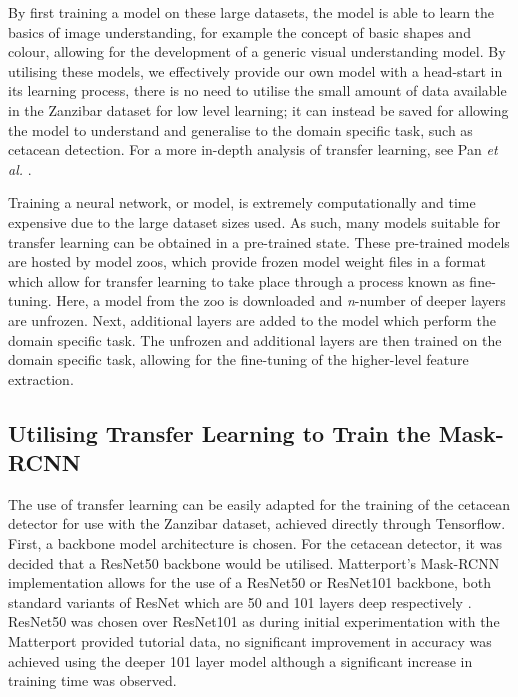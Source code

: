 By first training a model on these large datasets, the model is able to learn the basics of image understanding, for example the concept of basic shapes and colour, allowing for the development of a generic visual understanding model. By utilising these models, we effectively provide our own model with a head-start in its learning process, there is no need to utilise the small amount of data available in the Zanzibar dataset for low level learning; it can instead be saved for allowing the model to understand and generalise to the domain specific task, such as cetacean detection. For a more in-depth analysis of transfer learning, see Pan \textit{et al.} \cite{pan_survey_2010}.

Training a neural network, or model, is extremely computationally and time expensive due to the large dataset sizes used. As such, many models suitable for transfer learning can be obtained in a pre-trained state. These pre-trained models are hosted by model zoos, which provide frozen model weight files in a format which allow for transfer learning to take place through a process known as fine-tuning. Here, a model from the zoo is downloaded and \textit{n}-number of deeper layers are unfrozen. Next, additional layers are added to the model which perform the domain specific task. The unfrozen and additional layers are then trained on the domain specific task, allowing for the fine-tuning of the higher-level feature extraction. 

\subsection{Utilising Transfer Learning to Train the Mask-RCNN}\label{ch:cetDet,sec:initialTesting,sub:transferLearningforTheDetector}

The use of transfer learning can be easily adapted for the training of the cetacean detector for use with the Zanzibar dataset, achieved directly through Tensorflow. First, a backbone model architecture is chosen. For the cetacean detector, it was decided that a ResNet50 backbone would be utilised. Matterport's Mask-RCNN implementation allows for the use of a ResNet50 or ResNet101 backbone, both standard variants of ResNet which are 50 and 101 layers deep respectively \cite{he_deep_2015}. ResNet50 was chosen over ResNet101 as during initial experimentation with the Matterport provided tutorial data, no significant improvement in accuracy was achieved using the deeper 101 layer model although a significant increase in training time was observed.

